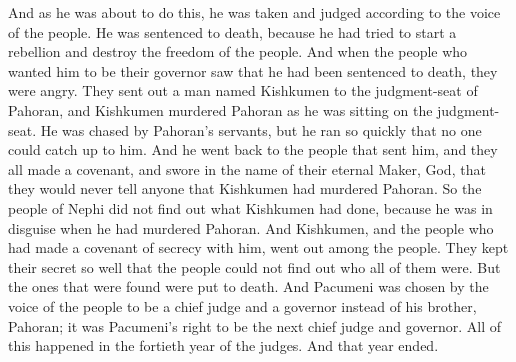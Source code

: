 And as he was about to do this, he was taken and judged according to the voice of the people. He was sentenced to death, because he had tried to start a rebellion and destroy the freedom of the people.
\bverse \iffalse Now when those people who were desirous that he should be their governor saw that he was condemned unto death, therefore they were angry, and behold, they sent forth one Kishkumen, even to the judgment-seat of Pahoran, and murdered Pahoran as he sat upon the judgment-seat. \fi
And when the people who wanted him to be their governor saw that he had been sentenced to death, they were angry. They sent out a man named Kishkumen to the judgment-seat of Pahoran, and Kishkumen murdered Pahoran as he was sitting on the judgment-seat.
\bverse \iffalse And he was pursued by the servants of Pahoran; but behold, so speedy was the flight of Kishkumen that no man could overtake him. \fi
He was chased by Pahoran's servants, but he ran so quickly that no one could catch up to him.
\bverse \iffalse And he went unto those that sent him, and they all entered into a covenant, yea, swearing by their everlasting Maker, that they would tell no man that Kishkumen had murdered Pahoran. \fi
And he went back to the people that sent him, and they all made a covenant, and swore in the name of their eternal Maker, God, that they would never tell anyone that Kishkumen had murdered Pahoran.
\bverse \iffalse Therefore, Kishkumen was not known among the people of Nephi, for he was in disguise at the time that he murdered Pahoran. And Kishkumen and his band, who had covenanted with him, did mingle themselves among the people, in a manner that they all could not be found; but as many as were found were condemned unto death. \fi
So the people of Nephi did not find out what Kishkumen had done, because he was in disguise when he had murdered Pahoran. And Kishkumen, and the people who had made a covenant of secrecy with him, went out among the people. They kept their secret so well that the people could not find out who all of them were. But the ones that were found were put to death.
\bverse \iffalse And now behold, Pacumeni was appointed, according to the voice of the people, to be a chief judge and a governor over the people, to reign in the stead of his brother Pahoran; and it was according to his right. And all this was done in the fortieth year of the reign of the judges; and it had an end. \fi
And Pacumeni was chosen by the voice of the people to be a chief judge and a governor instead of his brother, Pahoran; it was Pacumeni's right to be the next chief judge and governor. All of this happened in the fortieth year of the judges. And that year ended.
